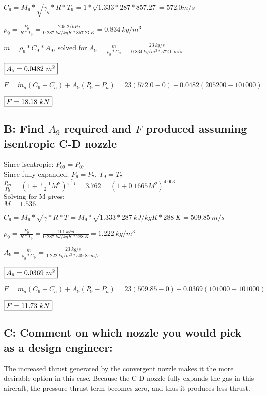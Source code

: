 \documentclass{article}
\begin{document}
$C_9=M_9*\sqrt{\gamma_g*R*T_9}=1*\sqrt{1.333*287*857.27}=572.0 m/s$

$\rho_9=\frac{P_9}{R*T_9}=\frac{205.2/ kPa}{0.287\ kJ/kgK*857.27\ K}=0.834\ kg/m^3$

$\dot{m}=\rho_9*C_9*A_9$, solved for $A_9=\frac{\dot{m}}{\rho_9*C_9}=\frac{23\ kg/s}{0.834\ kg/m^3*572.0\ m/s}$

$\fbox{$A_5=0.0482\ m^2$}$

$F=\dot{m}_a(C_9-C_a)+A_9(P_9-P_a)=23(572.0-0)+0.0482(205200-101000)$

$\fbox{$F=18.18\ kN$}$
\\

\subsection*{B: Find $A_9$ required and $F$ produced assuming isentropic C-D nozzle}

Since isentropic: $P_{09}=P_{07}$
\\

Since fully expanded: $P_9=P_7,\ T_9=T_7$
\\

$\frac{P_09}{P_9}=(1+\frac{\gamma-1}{2}M^2)^{\frac{\gamma}{\gamma-1}}=3.762=(1+0.1665M^2)^{4.003}$
\\

Solving for M gives:
\\

$M=1.536$

$C_9=M_9*\sqrt{\gamma*R*T}=M_9*\sqrt{1.333*287\ kJ/kgK*288\ K}=509.85\ m/s$

$\rho_9=\frac{P_9}{R*T_9}=\frac{101\ kPa}{0.287\ kJ/kgK*288\ K}=1.222\ kg/m^3$

$A_9=\frac{\dot{m}}{\rho_9*C_9}=\frac{23\ kg/s}{1.222\ kg/m^3*509.85\ m/s}$

$\fbox{$A_9=0.0369\ m^2$}$

$F=\dot{m}_a(C_9-C_a)+A_9(P_9-P_a)=23(509.85-0)+0.0369(101000-101000)$

$\fbox{$F=11.73\ kN$}$
\\

\subsection*{C: Comment on which nozzle you would pick as a design engineer:}

The increased thrust generated by the convergent nozzle makes it
the more desirable option in this case. Because the C-D nozzle
fully expands the gas in this aircraft, the pressure thrust term
becomes zero, and thus it produces less thrust. 
\\
\\
\end{document}
